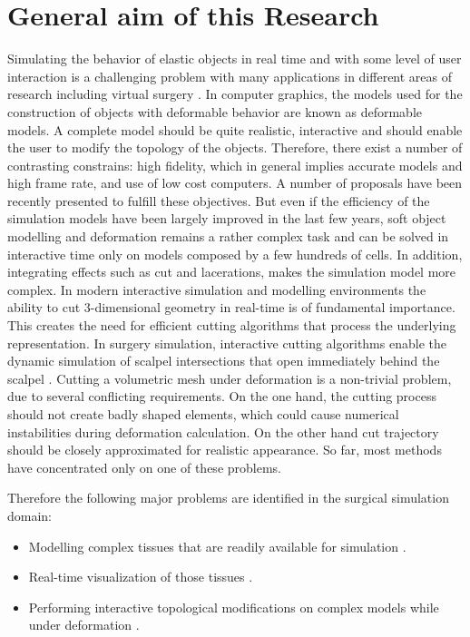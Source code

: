

\label{chapter:introduction}
\section{General aim of this Research}
Simulating the behavior of elastic objects in real time and with some level of user interaction is a challenging problem 
with many applications in different areas of research including virtual surgery \cite{Meier2005}. 
In computer graphics, the models used for the construction of objects with deformable behavior are known as deformable models. 
A complete model should be quite realistic, interactive and should enable the user to modify the topology of the objects.
Therefore, there exist a number of contrasting constrains: high fidelity, which in general implies accurate models and high frame rate,
and use of low cost computers. A number of proposals have been recently presented to fulfill these objectives. But even if the efficiency
of the simulation models have been largely improved in the last few years, soft object modelling and deformation remains a rather 
complex task and can be solved in interactive time only on models composed by a few hundreds of cells. In addition, integrating effects
such as cut and lacerations, makes the simulation model more complex. In modern interactive simulation and modelling environments the ability to 
cut 3-dimensional geometry in real-time is of fundamental importance. This creates the need for efficient cutting algorithms that process the 
underlying representation. In surgery simulation, interactive cutting algorithms enable the dynamic simulation of scalpel intersections that open 
immediately behind the scalpel \cite{Nienhuys2001a}. Cutting a volumetric mesh under deformation is a non-trivial problem, due to several conflicting
requirements. On the one hand, the cutting process should not create badly shaped elements, which could cause numerical instabilities during deformation
calculation. On the other hand cut trajectory should be closely approximated for realistic appearance. So far, most methods have concentrated only on 
one of these problems. 

Therefore the following major problems are identified in the surgical simulation domain:

\begin{itemize}
 \item Modelling complex tissues that are readily available for simulation \cite{Nealen2006,Meier2005,Gibson1997a}.
 \item Real-time visualization of those tissues \cite{Mario2010PolygonMesh,Bloomenthal1997}.
 \item Performing interactive topological modifications on complex models while under deformation \cite{Jin2013, Wu2011, Courtecuisse2010, Jerabkova2010}. 
\end{itemize}

